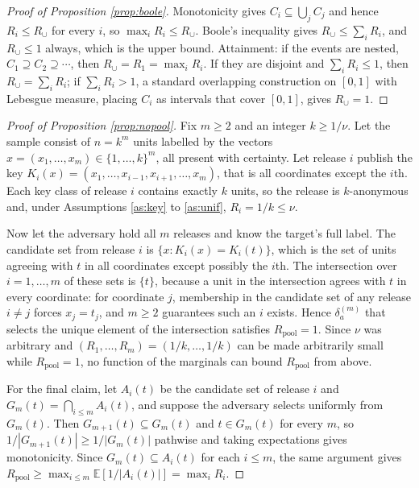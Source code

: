 \documentclass[11pt,a4paper]{article}
\theoremstyle{plain}
\theoremstyle{definition}
\newcommand{\E}{\mathbb{E}}
\begin{document}
\begin{proof}[Proof of Proposition \ref{prop:boole}]
Monotonicity gives $C_i \subseteq \bigcup_j C_j$ and hence $R_i \leq R_\cup$
for every $i$, so $\max_i R_i \leq R_\cup$. Boole's inequality gives $R_\cup
\leq \sum_i R_i$, and $R_\cup \leq 1$ always, which is the upper bound.
Attainment: if the events are nested, $C_1 \supseteq C_2 \supseteq \cdots$,
then $R_\cup = R_1 = \max_i R_i$. If they are disjoint and $\sum_i R_i \leq 1$,
then $R_\cup = \sum_i R_i$; if $\sum_i R_i > 1$, a standard overlapping
construction on $[0,1]$ with Lebesgue measure, placing $C_i$ as intervals that
cover $[0,1]$, gives $R_\cup = 1$.
\end{proof}

\begin{proof}[Proof of Proposition \ref{prop:nopool}]
Fix $m \geq 2$ and an integer $k \geq 1/\nu$. Let the sample consist of
$n = k^m$ units labelled by the vectors $x = (x_1, \dots, x_m) \in \{1, \dots,
k\}^m$, all present with certainty. Let release $i$ publish the key
$K_i(x) = (x_1, \dots, x_{i-1}, x_{i+1}, \dots, x_m)$, that is all coordinates
except the $i$th. Each key class of release $i$ contains exactly $k$ units, so
the release is $k$-anonymous and, under Assumptions \ref{as:key} to
\ref{as:unif}, $R_i = 1/k \leq \nu$.

Now let the adversary hold all $m$ releases and know the target's full label.
The candidate set from release $i$ is $\{x : K_i(x) = K_i(t)\}$, which is the
set of units agreeing with $t$ in all coordinates except possibly the $i$th.
The intersection over $i = 1, \dots, m$ of these sets is $\{t\}$, because a
unit in the intersection agrees with $t$ in every coordinate: for coordinate
$j$, membership in the candidate set of any release $i \neq j$ forces
$x_j = t_j$, and $m \geq 2$ guarantees such an $i$ exists. Hence
$\delta_a^{(m)}$ that selects the unique element of the intersection satisfies
$R_{\mathrm{pool}} = 1$. Since $\nu$ was arbitrary and
$(R_1, \dots, R_m) = (1/k, \dots, 1/k)$ can be made arbitrarily small while
$R_{\mathrm{pool}} = 1$, no function of the marginals can bound
$R_{\mathrm{pool}}$ from above.

For the final claim, let $A_i(t)$ be the candidate set of release $i$ and
$G_m(t) = \bigcap_{i \leq m} A_i(t)$, and suppose the adversary selects
uniformly from $G_m(t)$. Then $G_{m+1}(t) \subseteq G_m(t)$ and $t \in G_m(t)$
for every $m$, so $1/|G_{m+1}(t)| \geq 1/|G_m(t)|$ pathwise and taking
expectations gives monotonicity. Since $G_m(t) \subseteq A_i(t)$ for each
$i \leq m$, the same argument gives $R_{\mathrm{pool}} \geq \max_{i \leq m}
\E[1/|A_i(t)|] = \max_i R_i$.
\end{proof}
\end{document}
